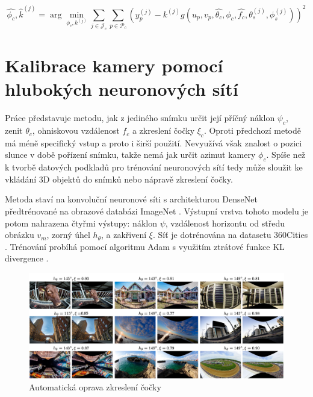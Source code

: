 \begin{equation}
    \hat{\phi_c}, \hat{k}^{(j)} = \arg\min_{\phi_c, k^{(j)}}  \sum_{j\in\mathcal{J}_c} \sum_{p\in\mathcal{P}_c} \left( y^{(j)}_p - k^{(j)}g(u_p, v_p, \hat{\theta_c}, \phi_c, \hat{f_c}, \theta^{(j)}_s, \phi^{(j)}_s)\right)^2
\end{equation}


    




\section{Kalibrace kamery pomocí hlubokých neuronových sítí}
Práce \cite{deepcalib} představuje metodu, jak z jediného snímku určit její příčný náklon $\psi_c$, zenit $\theta_c$, ohniskovou vzdálenost $f_c$ a zkreslení čočky $\xi_c$.
Oproti předchozí metodě má méně specifický vstup a proto i širší použití. 
Nevyužívá však znalost o pozici slunce v době pořízení snímku, takže nemá jak určit azimut kamery $\phi_c$.
Spíše než k tvorbě datových podkladů pro trénování neuronových sítí tedy může sloužit ke vkládání 3D objektů do snímků nebo nápravě zkreslení čočky.

Metoda staví na konvoluční neuronové síti s architekturou DenseNet \citeauthor{densenet} předtrénované na obrazové databázi ImageNet \citep{imagenet}. 
Výstupní vrstva tohoto modelu je potom nahrazena čtyřmi výstupy: náklon $\psi$, vzdálenost horizontu od středu obrázku $v_m$, zorný úhel $h_\theta$, a zakřivení $\xi$.
Síť je dotrénována na datasetu 360Cities \citep{360cities}. Trénování probíhá pomocí algoritmu Adam \citep{adam} s využitím ztrátové funkce KL divergence \citep{kldivergence}.

\begin{figure}[htb]\centering
    \includegraphics[width=140mm]{../img/distortion}
    \caption{Automatická oprava zkreslení čočky \citep{deepcalib}}
\end{figure}

